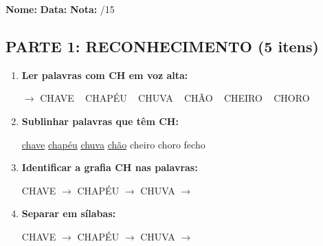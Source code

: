 \begin{exercicio}



\noindent\textbf{Nome:} \underline{\hspace{3.2cm}} \quad \textbf{Data:} \underline{\hspace{1.6cm}} \quad \textbf{Nota:} \underline{\hspace{0.9cm}}/15


\subsection*{PARTE 1: RECONHECIMENTO (5 itens)}

\begin{enumerate}

  \item \textbf{Ler palavras com CH em voz alta:}
  \begin{center}
  $\rightarrow$ CHAVE ~ CHAPÉU ~ CHUVA ~ CHÃO ~ CHEIRO ~ CHORO
  \end{center}

  \item \textbf{Sublinhar palavras que têm CH:}

\begin{center}
  \uline{chave} \quad \uline{chapéu} \quad \uline{chuva} \quad \uline{chão} \quad cheiro \quad choro \quad fecho
\end{center}

  \item \textbf{Identificar a grafia CH nas palavras:}
  \begin{center}
  CHAVE $\rightarrow$ \underline{\hspace{1cm}} \quad CHAPÉU $\rightarrow$ \underline{\hspace{1cm}} \quad CHUVA $\rightarrow$ \underline{\hspace{1cm}}
  \end{center}

  \item \textbf{Separar em sílabas:}
  \begin{center}
  CHAVE $\rightarrow$ \underline{\hspace{1.2cm}} \quad CHAPÉU $\rightarrow$ \underline{\hspace{1.2cm}} \quad CHUVA $\rightarrow$ \underline{\hspace{1.2cm}}
  \end{center}


\end{enumerate}
\end{exercicio}
